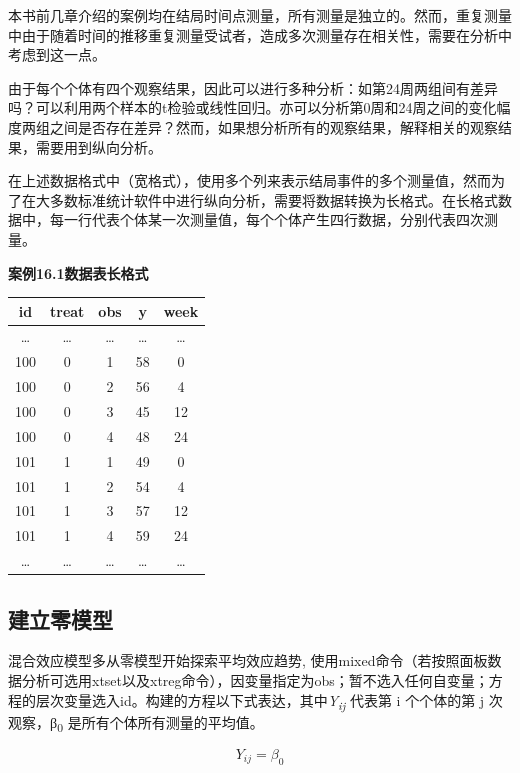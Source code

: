 \documentclass[
  chinese-hans,
  letterpaper,
  DIV=11,
  numbers=noendperiod]{scrreprt}
\newcounter{none} %
\begin{document}
本书前几章介绍的案例均在结局时间点测量，所有测量是独立的。然而，重复测量中由于随着时间的推移重复测量受试者，造成多次测量存在相关性，需要在分析中考虑到这一点。

由于每个个体有四个观察结果，因此可以进行多种分析：如第24周两组间有差异吗？可以利用两个样本的t检验或线性回归。亦可以分析第0周和24周之间的变化幅度两组之间是否存在差异？然而，如果想分析所有的观察结果，解释相关的观察结果，需要用到纵向分析。

在上述数据格式中（宽格式），使用多个列来表示结局事件的多个测量值，然而为了在大多数标准统计软件中进行纵向分析，需要将数据转换为长格式。在长格式数据中，每一行代表个体某一次测量值，每个个体产生四行数据，分别代表四次测量。

\textbf{案例16.1数据表长格式}

{\def\LTcaptype{none} %
\begin{longtable}[]{@{}ccccc@{}}
\toprule\noalign{}
id & treat & obs & y & week \\
\midrule\noalign{}
\endhead
\bottomrule\noalign{}
\endlastfoot
\ldots{} & \ldots{} & \ldots{} & \ldots{} & \ldots{} \\
100 & 0 & 1 & 58 & 0 \\
100 & 0 & 2 & 56 & 4 \\
100 & 0 & 3 & 45 & 12 \\
100 & 0 & 4 & 48 & 24 \\
101 & 1 & 1 & 49 & 0 \\
101 & 1 & 2 & 54 & 4 \\
101 & 1 & 3 & 57 & 12 \\
101 & 1 & 4 & 59 & 24 \\
\ldots{} & \ldots{} & \ldots{} & \ldots{} & \ldots{} \\
\end{longtable}
}

\subsection{建立零模型}\label{ux5efaux7acbux96f6ux6a21ux578b}

混合效应模型多从零模型开始探索平均效应趋势,
使用mixed命令（若按照面板数据分析可选用xtset以及xtreg命令），因变量指定为obs；暂不选入任何自变量；方程的层次变量选入id。构建的方程以下式表达，其中\emph{Y\textsubscript{ij}}
代表第 i 个个体的第 j 次观察，β\textsubscript{0}
是所有个体所有测量的平均值。

\[Y_{ij} = \beta_{0}\]
\end{document}
